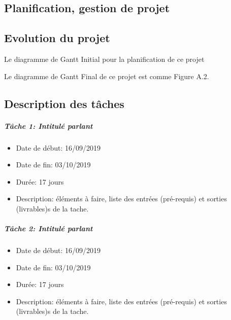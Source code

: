 \documentclass{polytech/polytech}
\numberwithin{figure}{chapter}
\begin{document}
\begin{appendix}

\chapter{Planification, gestion de projet}   

\section{Evolution du projet}

Le diagramme de Gantt Initial pour la planification de ce projet 


Le diagramme de Gantt Final de ce projet est comme Figure A.2.



\section{Description des tâches}

\paragraph{Tâche 1: Intitulé parlant}

\begin{itemize}
    \item Date de début: 16/09/2019
    \item Date de fin: 03/10/2019
    \item Durée: 17 jours
    \item
        Description: éléments à faire,
        liste des entrées (pré-requis)
        et sorties (livrables)s de la tache.
\end{itemize}

\paragraph{Tâche 2: Intitulé parlant}

\begin{itemize}
    \item Date de début: 16/09/2019
    \item Date de fin: 03/10/2019
    \item Durée: 17 jours
    \item
        Description: éléments à faire,
        liste des entrées (pré-requis)
        et sorties (livrables)s de la tache.
\end{itemize}



\end{appendix}
\end{document}
